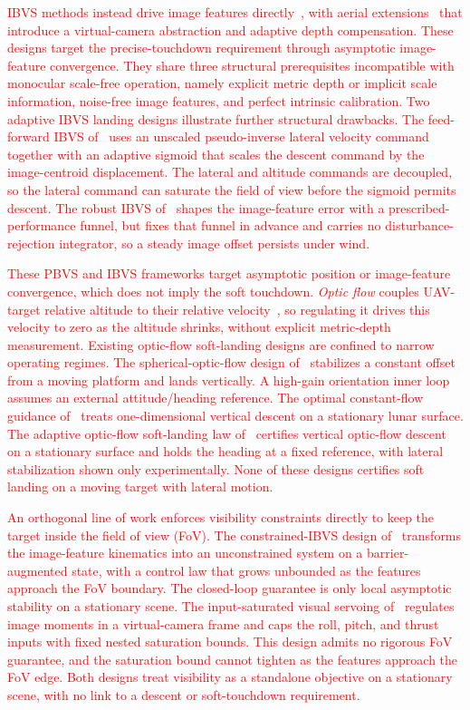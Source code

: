 \documentclass{IEEEtaes}
\newcommand{\new}[1]{\textcolor{red}{#1}}
\begin{document}
\new{IBVS methods instead drive image features directly~\cite{chaumette2006}, with aerial extensions~\cite{jabbari2014, lee2012, fink2017, xie2016_2, xie2020} that introduce a virtual-camera abstraction and adaptive depth compensation. These designs target the precise-touchdown requirement through asymptotic image-feature convergence. They share three structural prerequisites incompatible with monocular scale-free operation, namely explicit metric depth or implicit scale information, noise-free image features, and perfect intrinsic calibration. Two adaptive IBVS landing designs illustrate further structural drawbacks. The feed-forward IBVS of~\cite{cho2022} uses an unscaled pseudo-inverse lateral velocity command together with an adaptive sigmoid that scales the descent command by the image-centroid displacement. The lateral and altitude commands are decoupled, so the lateral command can saturate the field of view before the sigmoid permits descent. The robust IBVS of~\cite{lin2023} shapes the image-feature error with a prescribed-performance funnel, but fixes that funnel in advance and carries no disturbance-rejection integrator, so a steady image offset persists under wind.}

\new{These PBVS and IBVS frameworks target asymptotic position or image-feature convergence, which does not imply the soft touchdown. \emph{Optic flow} couples UAV-target relative altitude to their relative velocity~\cite{herisse2012, izzo2011, singhal2025}, so regulating it drives this velocity to zero as the altitude shrinks, without explicit metric-depth measurement. Existing optic-flow soft-landing designs are confined to narrow operating regimes. The spherical-optic-flow design of~\cite{herisse2012} stabilizes a constant offset from a moving platform and lands vertically. A high-gain orientation inner loop assumes an external attitude/heading reference. The optimal constant-flow guidance of~\cite{izzo2011} treats one-dimensional vertical descent on a stationary lunar surface. The adaptive optic-flow soft-landing law of~\cite{singhal2025} certifies vertical optic-flow descent on a stationary surface and holds the heading at a fixed reference, with lateral stabilization shown only experimentally. None of these designs certifies soft landing on a moving target with lateral motion.}

\new{An orthogonal line of work enforces visibility constraints directly to keep the target inside the field of view (FoV). The constrained-IBVS design of~\cite{salehi2021} transforms the image-feature kinematics into an unconstrained system on a barrier-augmented state, with a control law that grows unbounded as the features approach the FoV boundary. The closed-loop guarantee is only local asymptotic stability on a stationary scene. The input-saturated visual servoing of~\cite{xie2016} regulates image moments in a virtual-camera frame and caps the roll, pitch, and thrust inputs with fixed nested saturation bounds. This design admits no rigorous FoV guarantee, and the saturation bound cannot tighten as the features approach the FoV edge. Both designs treat visibility as a standalone objective on a stationary scene, with no link to a descent or soft-touchdown requirement.}
\end{document}
